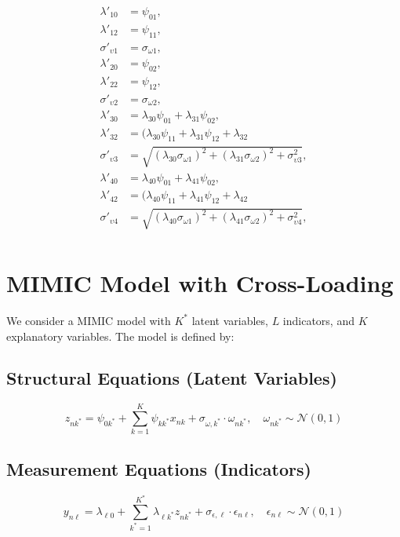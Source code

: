 \documentclass[12pt,a4paper]{article}
\begin{document}
\[
\begin{aligned}
  \lambda'_{10} &= \psi_{01}, \\
  \lambda'_{12} &= \psi_{11}, \\
  \sigma'_{\upsilon 1} &= \sigma_{\omega 1}, \\
  \lambda'_{20} &= \psi_{02}, \\
  \lambda'_{22} &= \psi_{12}, \\
  \sigma'_{\upsilon 2} &= \sigma_{\omega 2}, \\
  \lambda'_{30} &= \lambda_{30}  \psi_{01}+ \lambda_{31} \psi_{02}, \\
  \lambda'_{32} &= (\lambda_{30}\psi_{11}+ \lambda_{31} \psi_{12} +\lambda_{32} \\
  \sigma'_{\upsilon 3} &= \sqrt{(\lambda_{30}\sigma_{\omega 1})^ 2 + (\lambda_{31} \sigma_{\omega 2})^2 + \sigma^2_{\upsilon 3}}, \\
  \lambda'_{40} &= \lambda_{40}  \psi_{01}+ \lambda_{41} \psi_{02}, \\
  \lambda'_{42} &= (\lambda_{40}\psi_{11}+ \lambda_{41} \psi_{12} +\lambda_{42} \\
  \sigma'_{\upsilon 4} &= \sqrt{(\lambda_{40}\sigma_{\omega 1})^ 2 + (\lambda_{41} \sigma_{\omega 2})^2 + \sigma^2_{\upsilon 4}}, \\
\end{aligned}
\]

\section*{MIMIC Model with Cross-Loading}

We consider a MIMIC model with $K^*$ latent variables, $L$ indicators, and $K$ explanatory variables. The model is defined by:

\subsection*{Structural Equations (Latent Variables)}
\[
z_{nk^*} = \psi_{0k^*} + \sum_{k=1}^K \psi_{kk^*} x_{nk} + \sigma_{\omega, k^*} \cdot \omega_{nk^*}, \quad \omega_{nk^*} \sim \mathcal{N}(0,1)
\]

\subsection*{Measurement Equations (Indicators)}
\[
y_{n\ell} = \lambda_{\ell 0} + \sum_{k^*=1}^{K^*} \lambda_{\ell k^*} z_{nk^*} + \sigma_{\epsilon, \ell} \cdot \epsilon_{n\ell}, \quad \epsilon_{n\ell} \sim \mathcal{N}(0,1)
\]
\end{document}
